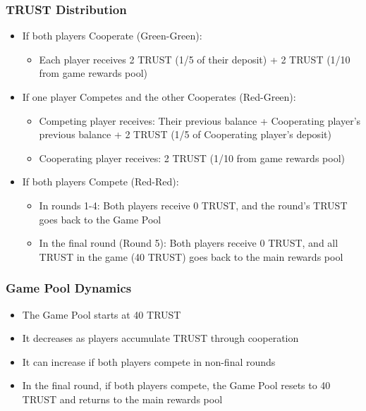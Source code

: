 \documentclass[12pt,a4paper]{article}
\begin{document}
\subsubsection{TRUST Distribution}
\begin{itemize}
    \item If both players Cooperate (Green-Green):
    \begin{itemize}
        \item Each player receives 2 TRUST (1/5 of their deposit) + 2 TRUST (1/10 from game rewards pool)
    \end{itemize}
    \item If one player Competes and the other Cooperates (Red-Green):
    \begin{itemize}
        \item Competing player receives: Their previous balance + Cooperating player's previous balance + 2 TRUST (1/5 of Cooperating player's deposit)
        \item Cooperating player receives: 2 TRUST (1/10 from game rewards pool)
    \end{itemize}
    \item If both players Compete (Red-Red):
    \begin{itemize}
        \item In rounds 1-4: Both players receive 0 TRUST, and the round's TRUST goes back to the Game Pool
        \item In the final round (Round 5): Both players receive 0 TRUST, and all TRUST in the game (40 TRUST) goes back to the main rewards pool
    \end{itemize}
\end{itemize}

\subsubsection{Game Pool Dynamics}
\begin{itemize}
    \item The Game Pool starts at 40 TRUST
    \item It decreases as players accumulate TRUST through cooperation
    \item It can increase if both players compete in non-final rounds
    \item In the final round, if both players compete, the Game Pool resets to 40 TRUST and returns to the main rewards pool
\end{itemize}
\end{document}
